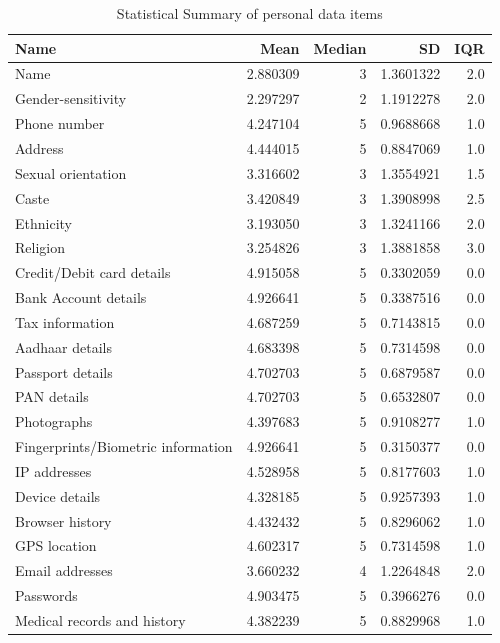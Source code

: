 \begin{table}[h]
\centering
\caption{Statistical Summary of personal data items} 
\label{tab:privacy_statistics}
\begin{tabular}{lrrrr}
\toprule
\textbf{Name} & \textbf{Mean} & \textbf{Median} & \textbf{SD} & \textbf{IQR} \\
\midrule
Name & 2.880309 & 3 & 1.3601322 & 2.0 \\
Gender-sensitivity & 2.297297 & 2 & 1.1912278 & 2.0 \\
Phone number & 4.247104 & 5 & 0.9688668 & 1.0 \\
Address & 4.444015 & 5 & 0.8847069 & 1.0 \\
Sexual orientation & 3.316602 & 3 & 1.3554921 & 1.5 \\
Caste & 3.420849 & 3 & 1.3908998 & 2.5 \\
Ethnicity & 3.193050 & 3 & 1.3241166 & 2.0 \\
Religion & 3.254826 & 3 & 1.3881858 & 3.0 \\
Credit/Debit card details & 4.915058 & 5 & 0.3302059 & 0.0 \\
Bank Account details & 4.926641 & 5 & 0.3387516 & 0.0 \\
Tax information & 4.687259 & 5 & 0.7143815 & 0.0 \\
Aadhaar details & 4.683398 & 5 & 0.7314598 & 0.0 \\
Passport details & 4.702703 & 5 & 0.6879587 & 0.0 \\
PAN details & 4.702703 & 5 & 0.6532807 & 0.0 \\
Photographs & 4.397683 & 5 & 0.9108277 & 1.0 \\
Fingerprints/Biometric information & 4.926641 & 5 & 0.3150377 & 0.0 \\
IP addresses & 4.528958 & 5 & 0.8177603 & 1.0 \\
Device details & 4.328185 & 5 & 0.9257393 & 1.0 \\
Browser history & 4.432432 & 5 & 0.8296062 & 1.0 \\
GPS location & 4.602317 & 5 & 0.7314598 & 1.0 \\
Email addresses & 3.660232 & 4 & 1.2264848 & 2.0 \\
Passwords & 4.903475 & 5 & 0.3966276 & 0.0 \\
Medical records and history & 4.382239 & 5 & 0.8829968 & 1.0 \\
\bottomrule

\end{tabular}
\end{table}

